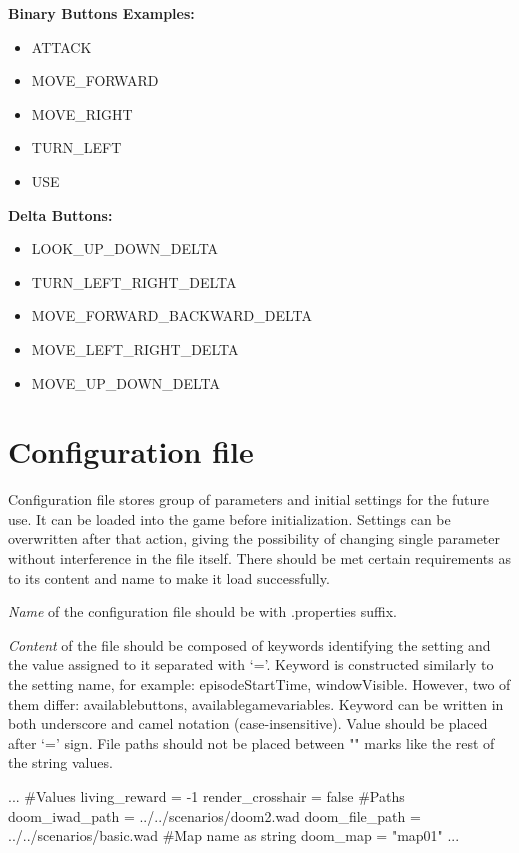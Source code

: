 \vspace{20pt}
\textbf{Binary Buttons Examples:}
\begin{itemize} 
	\item ATTACK
	\item MOVE\_FORWARD
	\item MOVE\_RIGHT
	\item TURN\_LEFT
	\item USE
\end{itemize}

\vspace{20pt}
\textbf{Delta Buttons:}
\begin{itemize} 
	 \item LOOK\_UP\_DOWN\_DELTA
	 \item TURN\_LEFT\_RIGHT\_DELTA
	 \item MOVE\_FORWARD\_BACKWARD\_DELTA
	 \item MOVE\_LEFT\_RIGHT\_DELTA
	 \item MOVE\_UP\_DOWN\_DELTA
\end{itemize}

\section{Configuration file}\label{sec:configuration_file}

	Configuration file stores group of parameters and initial settings for the future use. It can be loaded into the game before initialization. Settings can be overwritten after that action, giving the possibility of changing single parameter without interference in the file itself. There should be met certain requirements as to its content and name to make it load successfully.


	\emph{Name} of the configuration file should be with .properties suffix.

	\emph{Content} of the file should be composed of keywords identifying the setting and the value assigned to it separated with `='. Keyword is constructed similarly to the setting name, for example: episodeStartTime, windowVisible. However, two of them differ: availablebuttons, availablegamevariables.
Keyword can be written in both underscore and camel notation (case-insensitive). 
	Value should be placed after `=' sign. File paths should not be placed between "" marks like the rest of the string values.
\begin{pblock}
...
#Values
living_reward = -1
render_crosshair = false
#Paths
doom_iwad_path = ../../scenarios/doom2.wad
doom_file_path = ../../scenarios/basic.wad
#Map name as string
doom_map = "map01"
...
\end{pblock}

